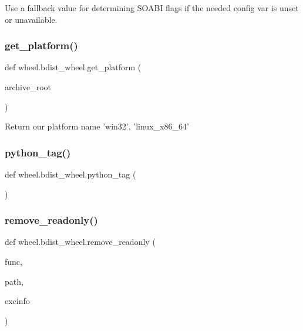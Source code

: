\begin{DoxyVerb}Use a fallback value for determining SOABI flags if the needed config
var is unset or unavailable.\end{DoxyVerb}
 \mbox{\label{namespacewheel_1_1bdist__wheel_aa327aba8fe11c2c8c8bf04093b9d0d96}} 
\subsubsection{\texorpdfstring{get\+\_\+platform()}{get\_platform()}}
{\footnotesize\ttfamily def wheel.\+bdist\+\_\+wheel.\+get\+\_\+platform (\begin{DoxyParamCaption}\item[{}]{archive\+\_\+root }\end{DoxyParamCaption})}

\begin{DoxyVerb}Return our platform name 'win32', 'linux_x86_64'\end{DoxyVerb}
 \mbox{\label{namespacewheel_1_1bdist__wheel_abfd7e653d6f0bf0130d7b8775b9ba27e}} 
\subsubsection{\texorpdfstring{python\+\_\+tag()}{python\_tag()}}
{\footnotesize\ttfamily def wheel.\+bdist\+\_\+wheel.\+python\+\_\+tag (\begin{DoxyParamCaption}{ }\end{DoxyParamCaption})}

\mbox{\label{namespacewheel_1_1bdist__wheel_a6ae0a4a0c313d1abf67df73ab6f921f2}} 
\subsubsection{\texorpdfstring{remove\+\_\+readonly()}{remove\_readonly()}}
{\footnotesize\ttfamily def wheel.\+bdist\+\_\+wheel.\+remove\+\_\+readonly (\begin{DoxyParamCaption}\item[{}]{func,  }\item[{}]{path,  }\item[{}]{excinfo }\end{DoxyParamCaption})}


